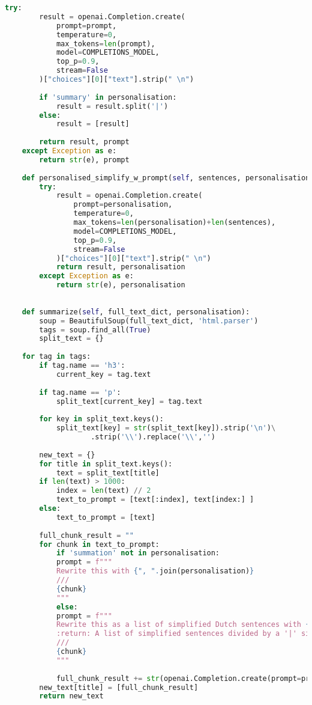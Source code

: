 \begin{lstlisting}[language=Python, caption={De gebruikte Python-klasse voor gepersonaliseerde ATS}, label={listing:gpt-class}]
	try:
		result = openai.Completion.create(
			prompt=prompt,
			temperature=0,
			max_tokens=len(prompt),
			model=COMPLETIONS_MODEL,
			top_p=0.9,
			stream=False
		)["choices"][0]["text"].strip(" \n")
	
		if 'summary' in personalisation:
			result = result.split('|')
		else:
			result = [result]
		
		return result, prompt
	except Exception as e:
		return str(e), prompt 
	
	def personalised_simplify_w_prompt(self, sentences, personalisation):
		try:
			result = openai.Completion.create(
				prompt=personalisation,
				temperature=0,
				max_tokens=len(personalisation)+len(sentences),
				model=COMPLETIONS_MODEL,
				top_p=0.9,
				stream=False
			)["choices"][0]["text"].strip(" \n")
			return result, personalisation
		except Exception as e:
			return str(e), personalisation
		
	
	def summarize(self, full_text_dict, personalisation):
		soup = BeautifulSoup(full_text_dict, 'html.parser')
		tags = soup.find_all(True)
		split_text = {}
	
	for tag in tags:
		if tag.name == 'h3':
			current_key = tag.text
	
		if tag.name == 'p':
			split_text[current_key] = tag.text
		
		for key in split_text.keys():
			split_text[key] = str(split_text[key]).strip('\n')\
					.strip('\\').replace('\\','')
	
		new_text = {}
		for title in split_text.keys():
			text = split_text[title]
		if len(text) > 1000:
			index = len(text) // 2
			text_to_prompt = [text[:index], text[index:] ]
		else:
			text_to_prompt = [text]
	
		full_chunk_result = ""
		for chunk in text_to_prompt:	
			if 'summation' not in personalisation:
			prompt = f"""
			Rewrite this with {", ".join(personalisation)}
			///
			{chunk}
			"""
			else:
			prompt = f"""
			Rewrite this as a list of simplified Dutch sentences with {", ".join(personalisation)}
			:return: A list of simplified sentences divided by a '|' sign
			///
			{chunk}
			"""
	
			full_chunk_result += str(openai.Completion.create(prompt=prompt,temperature=0,max_tokens=500,model=COMPLETIONS_MODEL,top_p=0.9,stream=False)["choices"][0]["text"].strip(" \n"))
		new_text[title] = [full_chunk_result]
		return new_text
\end{lstlisting}


